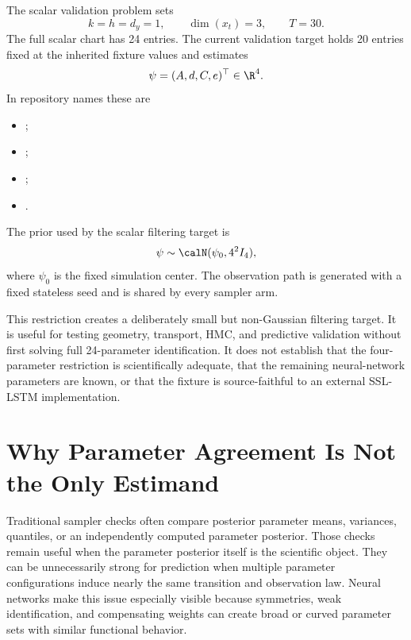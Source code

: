 The scalar validation problem sets
\begin{equation}
  k=h=d_y=1,
  \qquad \dim(x_t)=3,
  \qquad T=30.
  \label{eq:bf-scalar-ssl-lstm-dimensions}
\end{equation}
The full scalar chart has 24 entries.  The current validation target holds 20
entries fixed at the inherited fixture values and estimates
\begin{equation}
  \psi=(A,d,C,e)^\top\in\R^4.
  \label{eq:bf-scalar-ssl-lstm-free-parameters}
\end{equation}
In repository names these are
\begin{itemize}
  \item {};
  \item {};
  \item {};
  \item {}.
\end{itemize}
The prior used by the scalar filtering target is
\begin{equation}
  \psi\sim\calN(\psi_0,4^2 I_4),
  \label{eq:bf-scalar-ssl-lstm-prior}
\end{equation}
where $\psi_0$ is the fixed simulation center.  The observation path is
generated with a fixed stateless seed and is shared by every sampler arm.

This restriction creates a deliberately small but non-Gaussian filtering
target.  It is useful for testing geometry, transport, HMC, and predictive
validation without first solving full 24-parameter identification.  It does
not establish that the four-parameter restriction is scientifically adequate,
that the remaining neural-network parameters are known, or that the fixture is
source-faithful to an external SSL-LSTM implementation.

\section{Why Parameter Agreement Is Not the Only Estimand}
\label{sec:bf-predictive-vs-parameter-agreement}

Traditional sampler checks often compare posterior parameter means,
variances, quantiles, or an independently computed parameter posterior.  Those
checks remain useful when the parameter posterior itself is the scientific
object.  They can be unnecessarily strong for prediction when multiple
parameter configurations induce nearly the same transition and observation
law.  Neural networks make this issue especially visible because symmetries,
weak identification, and compensating weights can create broad or curved
parameter sets with similar functional behavior.

